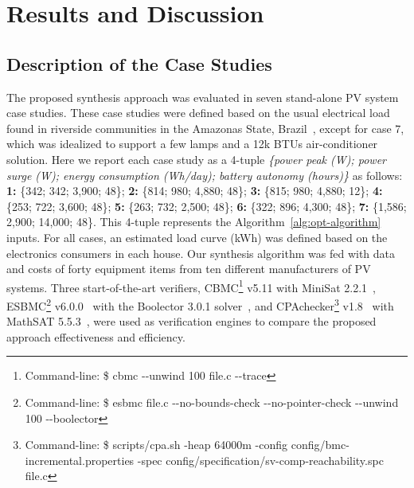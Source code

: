 \documentclass[runningheads]{llncs}
\begin{document}
\section{Results and Discussion}
\subsection{Description of the Case Studies}
The proposed synthesis approach was evaluated in seven stand-alone PV system case studies.
These case studies were defined based on the usual electrical load found in riverside communities in the Amazonas State, Brazil~\cite{TrindadeCordeiro19,Agrener2013}, except for case 7, which was idealized to support a few lamps and a 12k BTUs air-conditioner solution. 
Here we report each case study as a 4-tuple \textit{\{power peak (W); power surge (W); energy consumption (Wh/day); battery autonomy (hours)\}} as follows:
\textbf{1:} \{342; 342; 3,900; 48\}; \textbf{2:} \{814; 980; 4,880; 48\}; \textbf{3:} \{815; 980; 4,880; 12\}; \textbf{4:} \{253; 722; 3,600; 48\}; \textbf{5:} \{263; 732; 2,500; 48\}; \textbf{6:} \{322; 896; 4,300; 48\}; \textbf{7:} \{1,586; 2,900; 14,000; 48\}. This 4-tuple represents the Algorithm~\ref{alg:opt-algorithm} inputs. For all cases, an estimated load curve (kWh) was defined based on the electronics consumers in each house. Our synthesis algorithm was fed with data and costs of forty equipment items from ten different manufacturers of PV systems. 
%
Three start-of-the-art verifiers, CBMC\footnote{Command-line: \$ cbmc -\phantom{}-unwind 100 file.c -\phantom{}-trace} v5.11 with MiniSat 2.2.1~\cite{Kroening}, ESBMC\footnote{Command-line: \$ esbmc file.c -\phantom{}-no-bounds-check -\phantom{}-no-pointer-check -\phantom{}-unwind 100 -\phantom{}-boolector} v6.0.0~\cite{esbmc2018} with the Boolector 3.0.1 solver~\cite{Brummayer}, and CPAchecker\footnote{Command-line: \$ scripts/cpa.sh -heap 64000m -config config/bmc-incremental.properties -spec config/specification/sv-comp-reachability.spc file.c} v1.8~\cite{Beyer2011} with MathSAT 5.5.3~\cite{mathsat5}, were used as verification engines to compare the proposed approach effectiveness and efficiency. 

\end{document}
